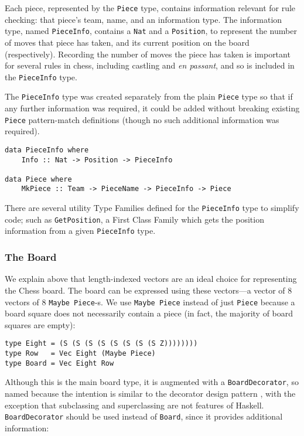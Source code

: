 \documentclass[12pt, a4paper, bibliography=totocnumbered]{scrreprt}
\newcommand{\inline}[1]{\lstinline[basicstyle=\ttfamily\footnotesize]{#1}}
\begin{document}
Each piece, represented by the \inline{Piece} type, contains information relevant for rule checking: that piece's team, name, and an information type. The information type, named \inline{PieceInfo}, contains a \inline{Nat} and a \inline{Position}, to represent the number of moves that piece has taken, and its current position on the board (respectively). Recording the number of moves the piece has taken is important for several rules in chess, including castling and \textit{en passant}, and so is included in the \inline{PieceInfo} type.

The \inline{PieceInfo} type was created separately from the plain \inline{Piece} type so that if any further information was required, it could be added without breaking existing \inline{Piece} pattern-match definitions (though no such additional information was required).

\begin{lstlisting}
data PieceInfo where
    Info :: Nat -> Position -> PieceInfo

data Piece where
    MkPiece :: Team -> PieceName -> PieceInfo -> Piece
\end{lstlisting}

There are several utility Type Families defined for the \inline{PieceInfo} type to simplify code; such as \inline{GetPosition}, a First Class Family which gets the position information from a given \inline{PieceInfo} type.

\subsubsection{The Board}

We explain above that length-indexed vectors are an ideal choice for representing the Chess board. The board can be expressed using these vectors---a vector of 8 vectors of 8 \inline{Maybe Piece}-s. We use \inline{Maybe Piece} instead of just \inline{Piece} because a board square does not necessarily contain a piece (in fact, the majority of board squares are empty):

\begin{lstlisting}
type Eight = (S (S (S (S (S (S (S (S Z))))))))
type Row   = Vec Eight (Maybe Piece)
type Board = Vec Eight Row
\end{lstlisting}

Although this is the main board type, it is augmented with a \inline{BoardDecorator}, so named because the intention is similar to the decorator design pattern \cite{decorator}, with the exception that subclassing and superclassing are not features of Haskell. \inline{BoardDecorator} should be used instead of \inline{Board}, since it provides additional information:
\end{document}

